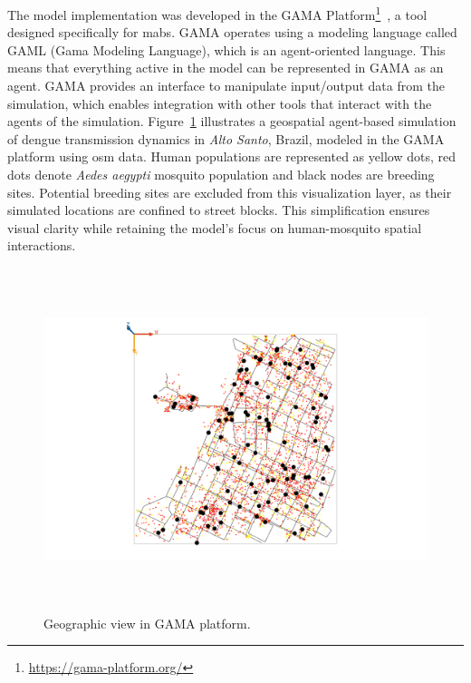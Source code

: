 The model implementation was developed in the GAMA
Platform\footnote{\url{https://gama-platform.org/}}~\citep{taillandier:2019}, a
tool designed specifically for \gls{mabs}. GAMA operates using a modeling
language called GAML (Gama Modeling Language), which is an agent-oriented
language. This means that everything active in the model can be represented in
GAMA as an agent. GAMA provides an interface to manipulate input/output data
from the simulation, which enables integration with other tools that interact
with the agents of the simulation. Figure~\ref{fig:example-gama} illustrates a
geospatial agent-based simulation of dengue transmission dynamics in
\textit{Alto Santo}, Brazil, modeled in the GAMA platform using \gls{osm} data.
Human populations are represented as yellow dots, red dots denote \textit{Aedes
	aegypti} mosquito population and black nodes are breeding sites. Potential
breeding sites are excluded from this visualization layer, as their simulated
locations are confined to street blocks. This simplification ensures visual
clarity while retaining the model’s focus on human-mosquito spatial
interactions.

\begin{figure}[!ht]
	\centering
	\includegraphics[width=16cm, height=10cm]{images/gama-example.png}
	\caption{Geographic view in GAMA platform.}
	\label{fig:example-gama}
\end{figure}
